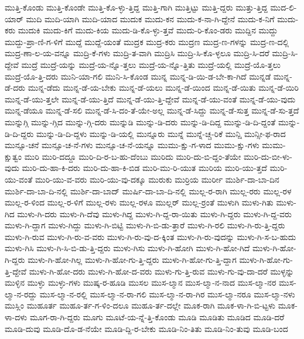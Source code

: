 {ಮುತ್ತಿ-ಕೊಂಡು
ಮುತ್ತಿ-ಕೊಂಡೇ
ಮುತ್ತಿ-ಕೊ-ಳ್ಳು-ತ್ತಿದ್ದ
ಮುತ್ತಿ-ಗಾಗಿ
ಮುತ್ತಿಟ್ಟು
ಮುತ್ತಿ-ದ್ದರು
ಮುತ್ತು-ತ್ತಿದ್ದ
ಮುದ-ಲಿ-ಯಾರ್
ಮುದಿ
ಮುದಿ-ಯಾಗಿ
ಮುದಿ-ಯಾದ
ಮುದುಕ
ಮುದು-ಕನ
ಮುದು-ಕ-ನಾ-ಗಿ-ದ್ದೇನೆ
ಮುದು-ಕ-ನಿಗೆ
ಮುದು-ಕರು
ಮುದುಕಿ
ಮುದು-ಕಿಗೆ
ಮುದು-ಕಿಯ
ಮುದು-ಡಿ-ಕೊ-ಳ್ಳು-ತ್ತವೆ
ಮುದು-ರಿ-ಕೊಂ-ಡರು
ಮುದ್ದಿನ
ಮುದ್ದು
ಮುದ್ದು-ಪ್ರಾ-ಣಿ-ಗ-ಳಿಗೆ
ಮುದ್ದೆ
ಮುದ್ದೆ-ಯಂತೆ
ಮುದ್ರಕ
ಮುದ್ರ-ಕರು
ಮುದ್ರಣ
ಮುದ್ರ-ಣ-ಗಳನ್ನು
ಮುದ್ರ-ಣ-ದಲ್ಲಿ
ಮುದ್ರ-ಣಾ-ಲ-ಯ-ವನ್ನೂ
ಮುದ್ರಿ-ಕೆ-ಗಳು
ಮುದ್ರಿ-ತ-ವಾಗಿ
ಮುದ್ರಿಸಿ
ಮುದ್ರಿ-ಸಿ-ಕೊ-ಳ್ಳಲೂ
ಮುದ್ರಿ-ಸಿ-ದರೆ
ಮುದ್ರಿ-ಸಿ-ದ್ದೇವೆ
ಮುದ್ರೆ
ಮುದ್ರೆ-ಯನ್ನು
ಮುದ್ರೆ-ಯ-ನ್ನೊ-ತ್ತಲು
ಮುದ್ರೆ-ಯ-ನ್ನೊ-ತ್ತಿತು
ಮುದ್ರೆ-ಯಲ್ಲಿ
ಮುದ್ರೆ-ಯೊ-ತ್ತಲು
ಮುದ್ರೆ-ಯೊ-ತ್ತಿ-ದರು
ಮುನಿ-ಯಾ-ಗಲಿ
ಮುನಿ-ಸಿ-ಕೊಂಡ
ಮುನ್ನ
ಮುನ್ನ-ಡಿ-ಯಿ-ಡ-ಬೇ-ಕಾ-ಗಿದೆ
ಮುನ್ನಡೆ
ಮುನ್ನ-ಡೆ-ದರು
ಮುನ್ನ-ಡೆದು
ಮುನ್ನ-ಡೆ-ಯ-ಬೇಕು
ಮುನ್ನ-ಡೆ-ಯಲು
ಮುನ್ನ-ಡೆ-ಯಿಂದ
ಮುನ್ನ-ಡೆ-ಯಿತು
ಮುನ್ನ-ಡೆ-ಯಿರಿ
ಮುನ್ನ-ಡೆ-ಯು-ತ್ತಲೇ
ಮುನ್ನ-ಡೆ-ಯು-ತ್ತಿದೆ
ಮುನ್ನ-ಡೆ-ಯು-ತ್ತಿ-ದ್ದೇವೆ
ಮುನ್ನ-ಡೆ-ಯು-ವಂತೆ
ಮುನ್ನ-ಡೆ-ಯು-ವುದು
ಮುನ್ನ-ಡೆಯೂ
ಮುನ್ನ-ಡೆ-ಸಲಿ
ಮುನ್ನ-ಡೆ-ಸಿ-ದಂ-ತೆ-ಯೇ-ಅಲ್ಲ
ಮುನ್ನ-ಡೆ-ಸಿದ್ದು
ಮುನ್ನ-ಡೆ-ಸುತ್ತ
ಮುನ್ನ-ಡೆ-ಸು-ತ್ತದೆ
ಮುನ್ನುಗ್ಗಿ
ಮುನ್ನು-ಗ್ಗಿದ
ಮುನ್ನು-ಗ್ಗಿ-ದರು
ಮುನ್ನುಡಿ
ಮುನ್ನು-ಡಿ-ದರು
ಮುನ್ನು-ಡಿ-ದಿದ್ದ
ಮುನ್ನು-ಡಿ-ದಿ-ದ್ದಂತೆ
ಮುನ್ನು-ಡಿ-ದಿ-ದ್ದರು
ಮುನ್ನು-ಡಿ-ದಿ-ದ್ದಳು
ಮುನ್ನು-ಡಿ-ಯಲ್ಲಿ
ಮುನ್ನೂರು
ಮುನ್ನೆ
ಮುನ್ನೆ-ಚ್ಚ-ರಿಕೆ
ಮುನ್ಷಿ
ಮುನ್ಸೀ-ಫ-ರಾದ
ಮುನ್ಸೂ-ಚನೆ
ಮುನ್ಸೂ-ಚ-ನೆ-ಗಳು
ಮುನ್ಸೂ-ಚ-ನೆ-ಯನ್ನೂ
ಮುಮು-ಕ್ಷು-ಗ-ಳಾದ
ಮುಮು-ಕ್ಷು-ಗಳು
ಮುಮು-ಕ್ಷುತ್ವಂ
ಮುರಿ
ಮುರಿ-ದದ್ದೂ
ಮುರಿ-ದಿ-ರ-ಬ-ಹು-ದೆಂಬು
ಮುರಿದು
ಮುರಿ-ದು-ಬಿ-ದ್ದಂ-ತೆಯೇ
ಮುರಿ-ದು-ಬೀ-ಳು-ವುದು
ಮುರಿ-ದು-ಹಾ-ಕಿ-ದರು
ಮುರಿ-ದು-ಹಾ-ಕಿ-ಬಿಡ
ಮುರಿ-ಮು-ರಿ-ಯುತ
ಮುರಿಯ
ಮುರಿ-ಯು-ತ್ತದೆ
ಮುರಿ-ಯು-ವಂತೆ
ಮುರಿ-ಯು-ವ-ವರು
ಮುರಿ-ಯು-ವು-ದಕ್ಕೂ
ಮುರುಕು
ಮುರ್ರಿಯ
ಮುರ್ರೀ
ಮುರ್ಶಿ-ದಾ-ಬಾ-ದಿನ
ಮುರ್ಶಿ-ದಾ-ಬಾ-ದಿ-ನಲ್ಲಿ
ಮುರ್ಶಿ-ದಾ-ಬಾದ್
ಮುರ್ಷಿ-ದಾ-ಬಾ-ದಿ-ನಲ್ಲಿ
ಮುಲ್ಲ-ರ-ರಾಗಿ
ಮುಲ್ಲ-ರರು
ಮುಲ್ಲ-ರಳ
ಮುಲ್ಲ-ರ-ಳಿಂದ
ಮುಲ್ಲ-ರ-ಳಿಗೆ
ಮುಲ್ಲ-ರಳು
ಮುಲ್ಲ-ರಳೂ
ಮುಲ್ಲರ್
ಮುಲ್ಲ-ರ್ರಂತೆ
ಮುಳುಗಿ
ಮುಳು-ಗಿತು
ಮುಳು-ಗಿದ
ಮುಳು-ಗಿ-ದರು
ಮುಳು-ಗಿ-ದೆವು
ಮುಳು-ಗಿದ್ದ
ಮುಳು-ಗಿ-ದ್ದ-ರಾ-ಯಿತು
ಮುಳು-ಗಿ-ದ್ದರು
ಮುಳು-ಗಿ-ದ್ದ-ವರು
ಮುಳು-ಗಿ-ದ್ದಾಗ
ಮುಳು-ಗಿದ್ದು
ಮುಳು-ಗಿ-ಬಿಟ್ಟಿ
ಮುಳು-ಗಿ-ಬಿ-ಡು-ತ್ತಾರೆ
ಮುಳು-ಗಿ-ರಲಿ
ಮುಳು-ಗಿ-ರು-ತ್ತಿ-ದ್ದರು
ಮುಳು-ಗಿ-ರುವ
ಮುಳು-ಗಿ-ರು-ವ-ವರು
ಮುಳು-ಗಿ-ರು-ವು-ದ-ಕ್ಕಿಂತ
ಮುಳು-ಗಿ-ರು-ವುದನ್ನು
ಮುಳು-ಗಿ-ಸ-ಬ-ಹುದು
ಮುಳು-ಗಿಸಿ
ಮುಳು-ಗಿ-ಸಿ-ಬಿ-ಡು-ತ್ತಿ-ದ್ದರು
ಮುಳು-ಗಿಸು
ಮುಳು-ಗಿ-ಹೋಗಿ
ಮುಳು-ಗಿ-ಹೋ-ಗಿದೆ
ಮುಳು-ಗಿ-ಹೋ-ಗಿ-ದ್ದರು
ಮುಳು-ಗಿ-ಹೋ-ಗಿಲ್ಲ
ಮುಳು-ಗಿ-ಹೋ-ಗು-ತ್ತಿ-ದ್ದರು
ಮುಳು-ಗಿ-ಹೋ-ಗು-ತ್ತಿ-ದ್ದಾಗ
ಮುಳು-ಗಿ-ಹೋ-ಗು-ತ್ತಿ-ದ್ದೇವೆ
ಮುಳು-ಗಿ-ಹೋ-ದರು
ಮುಳು-ಗಿ-ಹೋ-ದ-ವರು
ಮುಳು-ಗು-ತ್ತಿ-ರುವ
ಮುಳು-ಗು-ವು-ದಾ-ದರೆ
ಮುಳ್ಳನ್ನು
ಮುಳ್ಳಿನ
ಮುಳ್ಳು
ಮುಳ್ಳು-ಗಳು
ಮುಷ್ಕ-ರ-ಹೂಡಿ
ಮುಸಲ
ಮುಸ-ಲ್ಮಾನ
ಮುಸ-ಲ್ಮಾ-ನ-ನಾದ
ಮುಸ-ಲ್ಮಾ-ನರ
ಮುಸ-ಲ್ಮಾ-ನ-ರದ್ದು
ಮುಸ-ಲ್ಮಾ-ನ-ರಲ್ಲಿ
ಮುಸ-ಲ್ಮಾ-ನ-ರಾ-ಗಲಿ
ಮುಸ-ಲ್ಮಾ-ನ-ರಾ-ಗಿರ
ಮುಸ-ಲ್ಮಾ-ನರೂ
ಮುಸ-ಲ್ಮಾ-ನಳು
ಮುಸ್ಲಿಂ
ಮುಹೂರ್ತ
ಮುಹೂ-ರ್ತ-ಗ-ಳಿಂ-ದಲೂ
ಮುಹೂ-ರ್ತ-ದಲ್ಲೇ
ಮೂಕ-ರಾಗಿ
ಮೂಕ-ಳಾ-ಗಿ-ಬಿ-ಟ್ಟಳು
ಮೂಕ-ಳಾ-ದಳು
ಮೂಗ-ರಾ-ಗಿ-ದ್ದರು
ಮೂಗು
ಮೂಟೆ-ಯ-ನ್ನೆ-ತ್ತಿ-ಕೊಂಡು
ಮೂಡಿ
ಮೂಡಿತು
ಮೂಡಿದ
ಮೂಡಿ-ದರೆ
ಮೂಡಿ-ದುವು
ಮೂಡಿ-ದೊ-ಡ-ನೆಯೇ
ಮೂಡಿ-ದ್ದಿ-ರ-ಬೇಕು
ಮೂಡಿ-ನಿಂ-ತಿತು
ಮೂಡಿ-ನಿಂ-ತುವು
ಮೂಡಿ-ಬಂದ
}
